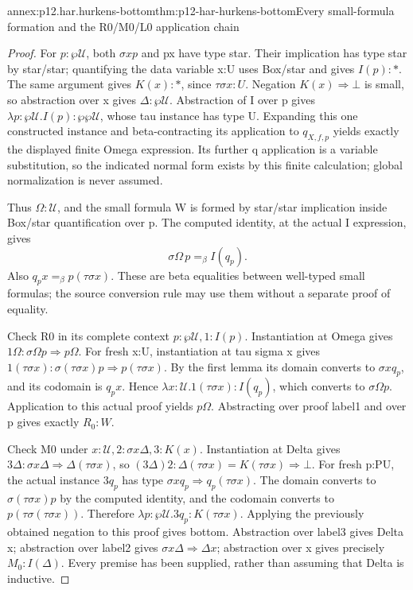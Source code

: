 \begin{annexitem}{annex:p12.har.hurkens-bottom}{thm:p12-har-hurkens-bottom}{Every small-formula formation and the R0/M0/L0 application chain}
\begin{proof}
For \(p:\wp\mathcal U\), both \(\sigma x p\) and px
have type star. Their implication has type star by star/star; quantifying
the data variable x:U uses Box/star and gives \(I(p):\ast\).
The same argument gives \(K(x):\ast\), since \(\tau\sigma x:U\).
Negation \(K(x)\Rightarrow\bot\) is small, so abstraction over
x gives \(\Delta:\wp\mathcal U\). Abstraction of I over
p gives \(\lambda p:\wp\mathcal U.I(p):\wp\wp\mathcal U\),
whose tau instance has type U. Expanding this one constructed instance
and beta-contracting its application to \(q_{X,f,p}\) yields exactly
the displayed finite Omega expression. Its further q application is a
variable substitution, so the indicated normal form exists by this
finite calculation; global normalization is never assumed.

Thus \(\Omega:\mathcal U\), and the small formula W is formed
by star/star implication inside Box/star quantification over p.
The computed identity, at the actual I expression, gives
\[
 \sigma\Omega\,p=_\beta I(q_p).
\]
Also \(q_p x=_\beta p(\tau\sigma x)\). These are beta
equalities between well-typed small formulas; the source conversion rule
may use them without a separate proof of equality.

Check R0 in its complete context \(p:\wp\mathcal U,1:I(p)\).
Instantiation at Omega gives
\(1\Omega:\sigma\Omega p\Rightarrow p\Omega\).
For fresh x:U, instantiation at tau sigma x gives
\(1(\tau\sigma x):
\sigma(\tau\sigma x)p\Rightarrow p(\tau\sigma x)\).
By the first lemma its domain converts to \(\sigma xq_p\),
and its codomain is \(q_p x\). Hence
\(\lambda x:\mathcal U.1(\tau\sigma x):I(q_p)\), which
converts to \(\sigma\Omega p\). Application to this actual
proof yields \(p\Omega\). Abstracting over proof label1 and
over p gives exactly \(R_0:W\).

Check M0 under \(x:\mathcal U,2:\sigma x\Delta,3:K(x)\).
Instantiation at Delta gives
\(3\Delta:\sigma x\Delta\Rightarrow\Delta(\tau\sigma x)\),
so \((3\Delta)2:\Delta(\tau\sigma x)
=K(\tau\sigma x)\Rightarrow\bot\).
For fresh p:PU, the actual instance \(3q_p\) has type
\(\sigma xq_p\Rightarrow q_p(\tau\sigma x)\).
The domain converts to \(\sigma(\tau\sigma x)p\) by the
computed identity, and the codomain converts to
\(p(\tau\sigma(\tau\sigma x))\). Therefore
\(\lambda p:\wp\mathcal U.3q_p:K(\tau\sigma x)\).
Applying the previously obtained negation to this proof gives bottom.
Abstraction over label3 gives Delta x; abstraction over label2 gives
\(\sigma x\Delta\Rightarrow\Delta x\); abstraction over x
gives precisely \(M_0:I(\Delta)\). Every premise has been supplied,
rather than assuming that Delta is inductive.


\end{proof}
\end{annexitem}
